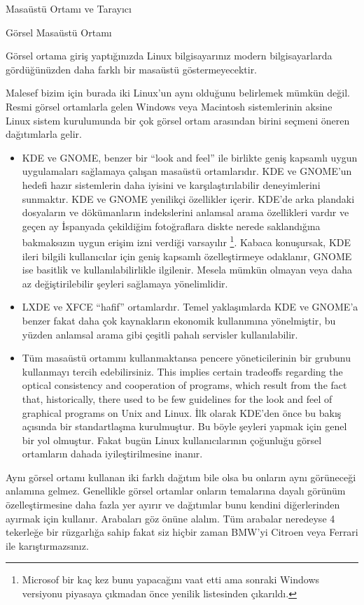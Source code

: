 \begin{section}{Masaüstü Ortamı ve Tarayıcı}
\begin{subsection}{Görsel Masaüstü Ortamı}

Görsel ortama giriş yaptığınızda Linux bilgisayarınız modern bilgisayarlarda gördüğünüzden daha farklı bir masaüstü göstermeyecektir. 

Malesef bizim için burada iki Linux’un aynı olduğunu belirlemek mümkün değil. Resmi görsel ortamlarla gelen Windows veya Macintosh sistemlerinin aksine Linux sistem kurulumunda bir çok görsel ortam arasından birini seçmeni öneren dağıtımlarla gelir. 
\begin{itemize}
\item KDE ve GNOME, benzer bir “look and feel” ile birlikte geniş kapsamlı uygun uygulamaları sağlamaya çalışan masaüstü ortamlarıdır. KDE ve GNOME’un hedefi hazır sistemlerin daha iyisini ve karşılaştırılabilir deneyimlerini sunmaktır. KDE ve GNOME yenilikçi özellikler içerir. KDE’de arka plandaki dosyaların ve dökümanların indekslerini anlamsal arama özellikleri vardır ve geçen ay İspanyada çekildiğim fotoğraflara diskte nerede saklandığına bakmaksızın uygun erişim izni verdiği varsayılır
\footnote{Microsof bir kaç kez bunu yapacağını vaat etti ama sonraki Windows versiyonu piyasaya çıkmadan önce yenilik listesinden çıkarıldı.}. Kabaca konuşursak, KDE ileri bilgili kullanıcılar için geniş kapsamlı özelleştirmeye odaklanır, GNOME ise basitlik ve kullanılabilirlikle ilgilenir. Mesela mümkün olmayan veya daha az değiştirilebilir şeyleri sağlamaya yönelimlidir. 
\item LXDE ve XFCE “hafif” ortamlardır. Temel yaklaşımlarda KDE ve GNOME’a benzer fakat daha çok kaynakların ekonomik kullanımına yönelmiştir, bu yüzden anlamsal arama gibi çeşitli pahalı servisler kullanılabilir. 
\item Tüm masaüstü ortamını kullanmaktansa pencere yöneticilerinin bir grubunu kullanmayı tercih edebilirsiniz. This implies certain tradeoffs regarding the optical consistency and cooperation of programs, which result from the fact that, historically, there used to be few guidelines for the look and feel of graphical programs on Unix and Linux. İlk olarak KDE’den önce bu bakış açısında bir standartlaşma kurulmuştur. Bu böyle şeyleri yapmak için genel bir yol olmuştur. Fakat bugün Linux kullanıcılarının çoğunluğu görsel ortamların  dahada iyileştirilmesine inanır. 
\end{itemize}

Aynı görsel ortamı kullanan iki farklı dağıtım bile olsa bu onların aynı görüneceği anlamına gelmez. Genellikle görsel ortamlar onların temalarına dayalı görünüm özelleştirmesine daha fazla yer ayırır ve dağıtımlar bunu kendini diğerlerinden ayırmak için kullanır. Arabaları göz önüne alalım. Tüm arabalar neredeyse 4 tekerleğe bir rüzgarlığa sahip fakat siz hiçbir zaman BMW’yi Citroen veya Ferrari ile karıştırmazsınız. 


\end{subsection}
\end{section}
